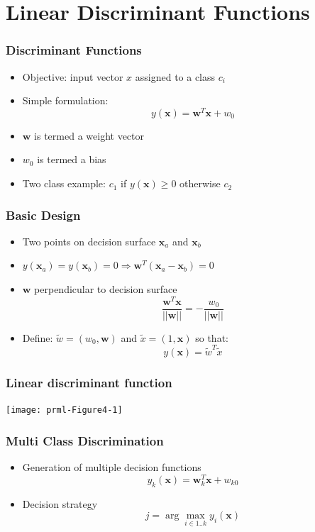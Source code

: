 \documentclass[10pt]{beamer}
\begin{document}
\section[Disc. Func.]{Linear Discriminant Functions}


\begin{frame}
  \frametitle{Discriminant Functions}
  \begin{itemize}
  \item Objective: input vector $x$ assigned to a class $c_i$
  \item Simple formulation:
    \[ y({\mathbf x}) = {\mathbf w}^T {\mathbf x} + w_0 \]
  \item $\mathbf w$ is termed a weight vector
  \item $w_0$ is termed a bias
  \item Two class example: $c_1$ if $y({\mathbf x}) \geq 0$ otherwise $c_2$
  \end{itemize}
\end{frame}

\begin{frame}
  \frametitle{Basic Design}
  \begin{itemize}
  \item Two points on decision surface ${\mathbf x}_a$ and ${\mathbf x}_b$
  \item $y({\mathbf x}_a) = y({\mathbf x}_b) = 0 \Rightarrow {\mathbf w}^T
    ({\mathbf x}_a - {\mathbf x}_b) = 0$
  \item ${\mathbf w}$ perpendicular to decision surface
    \[
    \frac{ {\mathbf w}^T {\mathbf x}}{|| {\mathbf w} ||} = -
    \frac{w_0}{|| {\mathbf w} ||} 
    \]
  \item Define: $\tilde{w} = (w_0, {\mathbf w})$ and $\tilde{x} =
    (1, {\mathbf x})$ so that:
    \[ y( {\mathbf x} ) = \tilde{w}^T \tilde{x} \]
  \end{itemize}
\end{frame}

\begin{frame}
  \frametitle{Linear discriminant function}
  \begin{center}
    \texttt{[image: prml-Figure4-1]}
  \end{center}
\end{frame}

\begin{frame}
  \frametitle{Multi Class Discrimination}
  \begin{itemize}
  \item Generation of multiple decision functions
    \[
    y_k({\mathbf x}) = {\mathbf w}_k^T {\mathbf x} + w_{k0}
    \]
  \item Decision strategy
    \[
    j = \arg \max_{i\in 1..k} y_i({\mathbf x})
    \]
  \end{itemize}
\end{frame}
\end{document}
